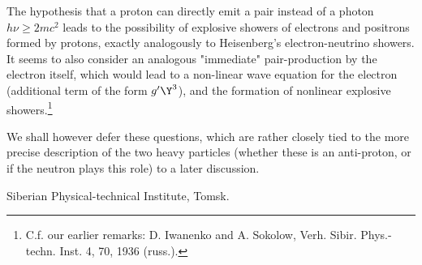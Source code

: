 \documentclass{article}
\begin{document}
The hypothesis that a proton can directly emit a pair instead of a photon $h\nu \ge 2mc^2$ leads to the possibility of explosive showers of electrons and positrons formed by protons, exactly analogously to Heisenberg's electron-neutrino showers. It seems  to also consider an analogous "immediate" pair-production by the electron itself, which would lead to a non-linear wave equation for the electron (additional term of the form $g'\Y^3$), and  the formation of nonlinear explosive showers.\footnote{C.f. our earlier remarks: D. Iwanenko and A. Sokolow, Verh. Sibir. Phys.-techn. Inst. 4, 70, 1936 (russ.).}

We shall however defer these questions, which are rather closely tied to the more precise description of the two heavy particles (whether these is an anti-proton, or if the neutron plays this role) to a later discussion.

Siberian Physical-technical Institute, Tomsk.
\end{document}
